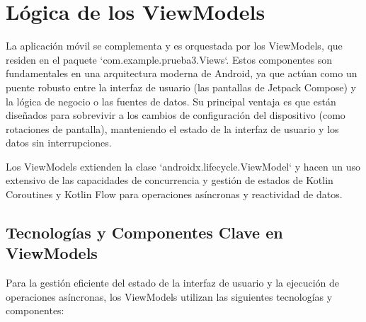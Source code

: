\section{Lógica de los ViewModels}

La aplicación móvil se complementa y es orquestada por los ViewModels, que residen en el paquete `com.example.prueba3.Views`. Estos componentes son fundamentales en una arquitectura moderna de Android, ya que actúan como un puente robusto entre la interfaz de usuario (las pantallas de Jetpack Compose) y la lógica de negocio o las fuentes de datos. Su principal ventaja es que están diseñados para sobrevivir a los cambios de configuración del dispositivo (como rotaciones de pantalla), manteniendo el estado de la interfaz de usuario y los datos sin interrupciones.

Los ViewModels extienden la clase `androidx.lifecycle.ViewModel` y hacen un uso extensivo de las capacidades de concurrencia y gestión de estados de Kotlin Coroutines y Kotlin Flow para operaciones asíncronas y reactividad de datos.

\subsection{Tecnologías y Componentes Clave en ViewModels}

Para la gestión eficiente del estado de la interfaz de usuario y la ejecución de operaciones asíncronas, los ViewModels utilizan las siguientes tecnologías y componentes:

